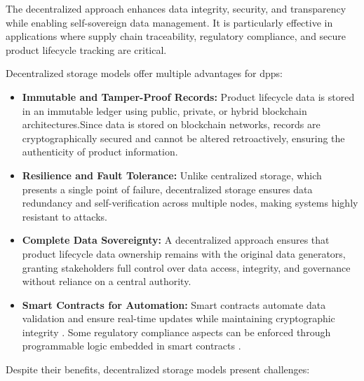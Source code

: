 The decentralized approach enhances data integrity, security, and transparency while enabling self-sovereign data management. It is particularly effective in applications where supply chain traceability, regulatory compliance, and secure product lifecycle tracking are critical. \autocite{Hulea.2024}

Decentralized storage models offer multiple advantages for \ac{dpp}s:

\begin{itemize}[itemsep=0.5\baselineskip]
    \item \textbf{Immutable and Tamper-Proof Records:} Product lifecycle data is stored in an immutable ledger using public, private, or hybrid blockchain architectures.Since data is stored on blockchain networks, records are cryptographically secured and cannot be altered retroactively, ensuring the authenticity of product information. \autocite{Nowacki.2023}
    
    \item \textbf{Resilience and Fault Tolerance:} Unlike centralized storage, which presents a single point of failure, decentralized storage ensures data redundancy and self-verification across multiple nodes, making systems highly resistant to attacks. \autocite{Hulea.2024}
    
    \item \textbf{Complete Data Sovereignty:} A decentralized approach ensures that product lifecycle data ownership remains with the original data generators, granting stakeholders full control over data access, integrity, and governance without reliance on a central authority. \autocite{Plociennik.2023}
    
    \item \textbf{Smart Contracts for Automation:} Smart contracts automate data validation and ensure real-time updates while maintaining cryptographic integrity \autocite{Nowacki.2023}. Some regulatory compliance aspects can be enforced through programmable logic embedded in smart contracts \autocite{Plociennik.2023}.
\end{itemize}

Despite their benefits, decentralized storage models present challenges:

